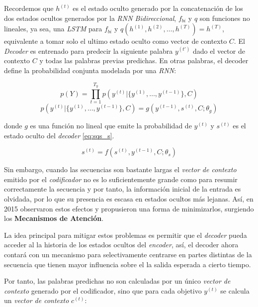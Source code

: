 Recordemos que $h^{(t)}$ es el estado oculto generado por la concatenación de los dos estados ocultos
generados por la \textit{RNN Bidireccional}, $f_{bi}$ y $q$ son funciones no lineales, ya sea,
una \textit{LSTM} para $f_{bi}$ y $q({h^{(1)}, h^{(2)}, \dots, h^{(T)}}) = h^{(T)}$, equivalente a
tomar solo el ultimo estado oculto como vector de contexto $C$. El \textit{Decoder} es entrenado
para predecir la siguiente palabra $y^{(t')}$ dado el vector de contexto $C$ y todas las palabras
previas predichas. En otras palabras, el decoder define la probabilidad conjunta modelada por una
\textit{RNN}:

\begin{equation}
    p(Y) = \prod_{t=1}^{T_y} p(y^{(t)} | \{y^{(1)}, \dots , y^{(t-1)}\}, C)
\end{equation}
\begin{equation}
    p(y^{(t)} | \{y^{(1)}, \dots , y^{(t-1)}\}, C) = g(y^{(t-1)}, s^{(t)}, C; \theta_g)
\end{equation}

donde $g$ es una función no lineal que emite la probabilidad de $y^{(t)}$ y $s^{(t)}$ es el estado oculto
del \textit{decoder} \ref{eq:sqs_s}.

\begin{equation}
    s^{(t)} = f(s^{(t)}, y^{(t-1)}, C; \theta_s)
    \label{eq:sqs_s}
\end{equation}


Sin embargo, cuando las secuencias son bastante largas el \textit{vector de contexto} emitido por el
\textit{codificador} no es lo suficientemente grande como para resumir correctamente la secuencia y
por tanto, la información inicial de la entrada es olvidada, por lo que su presencia es escasa en estados
ocultos más lejanas. Así, en 2015 \cite[Bahdanau et. al]{bahdanau2016neural} observaron estos efectos y
propusieron una forma de minimizarlos, surgiendo los \textbf{Mecanismos de Atención}.

La idea principal para mitigar estos problemas es permitir que el \textit{decoder} pueda acceder al
la historia de los estados ocultos del \textit{encoder}, así, el decoder ahora contará con un mecanismo
para selectivamente centrarse en partes distintas de la secuencia que tienen mayor influencia sobre el
la salida esperada a cierto tiempo.

Por tanto, las palabras predichas no son calculadas por un único \textit{vector de contexto} generado por
el codificador, sino que para cada objetivo $y^{(t)}$ se calcula un \textit{vector de contexto} $c^{(t)}$:

